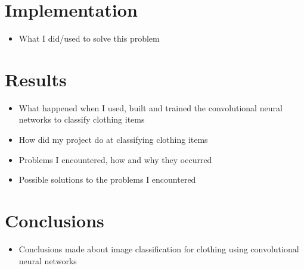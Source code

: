 \documentclass[12pt]{article} %
\begin{document}
\section{Implementation}
\begin{itemize}
\item What I did/used to solve this problem
\end{itemize}

\section{Results}
\begin{itemize}
\item What happened when I used, built and trained the convolutional neural networks to classify clothing items
\item How did my project do at classifying clothing items
\item Problems I encountered, how and why they occurred
\item Possible solutions to the problems I encountered
\end{itemize}

\section{Conclusions}
\begin{itemize}
\item Conclusions made about image classification for clothing using convolutional neural networks
\end{itemize}





\end{document}

